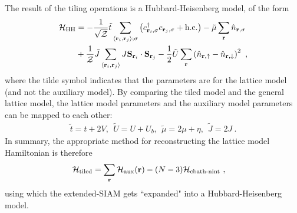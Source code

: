 \documentclass[reprint,hidelinks]{revtex4-2}
\begin{document}
The result of the tiling operations is a Hubbard-Heisenberg model, of the form
\begin{equation}\begin{aligned}
	\mathcal{H}_\text{HH} &= -\frac{1}{\sqrt\mathcal{Z}}\tilde t\sum_{\left<{\bf r}_i, {\bf r}_j\right>;\sigma}\left(c^\dagger_{{\bf r}_i,\sigma}c_{{\bf r}_j,\sigma} + \text{h.c.}\right) - \tilde \mu \sum_{{\bf r}}\hat n_{{\bf r},\sigma}\\
						  &+ \frac{1}{\mathcal{Z}}\tilde J\sum_{\left< {\bf r}_i, {\bf r}_j\right>}J {\bf S}_{{\bf r}_i}\cdot{\bf S}_{{\bf r}_j} - \frac{1}{2}\tilde U\sum_{\bf r}\left(\hat n_{{\bf r} , \uparrow} - \hat n_{{\bf r} , \downarrow}\right)^2  ~,
\end{aligned}\end{equation}
where the tilde symbol indicates that the parameters are for the lattice model (and not the auxiliary model). By comparing the tiled model and the general lattice model, the lattice model parameters and the auxiliary model parameters can be mapped to each other:
\begin{equation}\begin{aligned}\label{couplingsMappings}
	\tilde t = t+2V,~~ \tilde U = U + U_b, ~ ~ \tilde \mu = 2\mu + \eta,~ ~ \tilde J = 2J~.
\end{aligned}\end{equation}
In summary, the appropriate method for reconstructing the lattice model Hamiltonian is therefore
\begin{equation}\begin{aligned}\label{tilingPrescriptionFinal}
	\mathcal{H}_\text{tiled} &= \sum_{{\bf r}}\mathcal{H}_\text{aux}({\bf r}) - (N-3)\mathcal{H}_\text{cbath-nint}~,
\end{aligned}\end{equation}
using which the extended-SIAM gets ``expanded" into a Hubbard-Heisenberg model.
\end{document}
